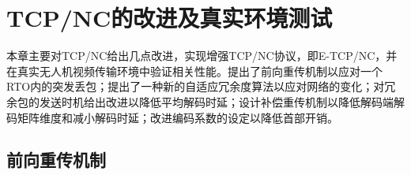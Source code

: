 \chapter{TCP/NC的改进及真实环境测试}
本章主要对TCP/NC给出几点改进，实现增强TCP/NC协议，即E-TCP/NC，并在真实无人机视频传输环境中验证相关性能。提出了前向重传机制以应对一个RTO内的突发丢包；提出了一种新的自适应冗余度算法以应对网络的变化；对冗余包的发送时机给出改进以降低平均解码时延；设计补偿重传机制以降低解码端解码矩阵维度和减小解码时延；改进编码系数的设定以降低首部开销。
\section{前向重传机制}
